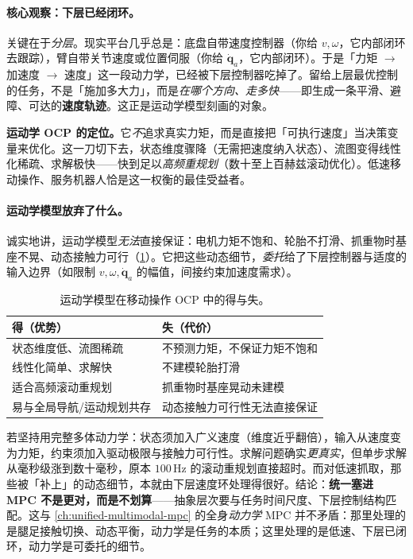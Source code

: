 \paragraph{核心观察：下层已经闭环。}
关键在于\emph{分层}。现实平台几乎总是：底盘自带速度控制器（你给 $v,\omega$，它内部闭环去跟踪），臂自带关节速度或位置伺服（你给 $\dot{\mathbf q}_a$，它内部闭环）。于是「力矩 $\to$ 加速度 $\to$ 速度」这一段动力学，已经被下层控制器吃掉了。留给上层最优控制的任务，不是「施加多大力」，而是\emph{在哪个方向、走多快}——即生成一条平滑、避障、可达的\textbf{速度轨迹}。这正是运动学模型刻画的对象。

\begin{insight}
\textbf{运动学 OCP 的定位。}\;它\emph{不}追求真实力矩，而是直接把「可执行速度」当决策变量来优化。这一刀切下去，状态维度骤降（无需把速度纳入状态）、流图变得线性化稀疏、求解极快——快到足以\emph{高频重规划}（数十至上百赫兹滚动优化）。低速移动操作、服务机器人恰是这一权衡的最佳受益者。
\end{insight}

\paragraph{运动学模型放弃了什么。}
诚实地讲，运动学模型\emph{无法}直接保证：电机力矩不饱和、轮胎不打滑、抓重物时基座不晃、动态接触力可行（\cref{tab:mmocp-kinpros}）。它把这些动态细节，\emph{委托}给了下层控制器与适度的输入边界（如限制 $v,\omega,\dot{\mathbf q}_a$ 的幅值，间接约束加速度需求）。

\begin{table}[H]\centering\small
\caption{运动学模型在移动操作 OCP 中的得与失。}
\label{tab:mmocp-kinpros}
\begin{tabular}{ll}
\toprule
得（优势） & 失（代价） \\
\midrule
状态维度低、流图稀疏 & 不预测力矩，不保证力矩不饱和 \\
线性化简单、求解快 & 不建模轮胎打滑 \\
适合高频滚动重规划 & 抓重物时基座晃动未建模 \\
易与全局导航/运动规划共存 & 动态接触力可行性无法直接保证 \\
\bottomrule
\end{tabular}
\end{table}

\begin{pitfall}
若坚持用完整多体动力学：状态须加入广义速度（维度近乎翻倍），输入从速度变为力矩，约束须加入驱动极限与接触力可行性。求解问题确实\emph{更真实}，但单步求解从毫秒级涨到数十毫秒，原本 $100\,\mathrm{Hz}$ 的滚动重规划直接超时。而对低速抓取，那些被「补上」的动态细节，本就由下层速度环处理得很好。结论：\textbf{统一塞进 MPC 不是更对，而是不划算}——抽象层次要与任务时间尺度、下层控制结构匹配。这与 \cref{ch:unified-multimodal-mpc} 的全身\emph{动力学} MPC 并不矛盾：那里处理的是腿足接触切换、动态平衡，动力学是任务的本质；这里处理的是低速、下层已闭环，动力学是可委托的细节。
\end{pitfall}

